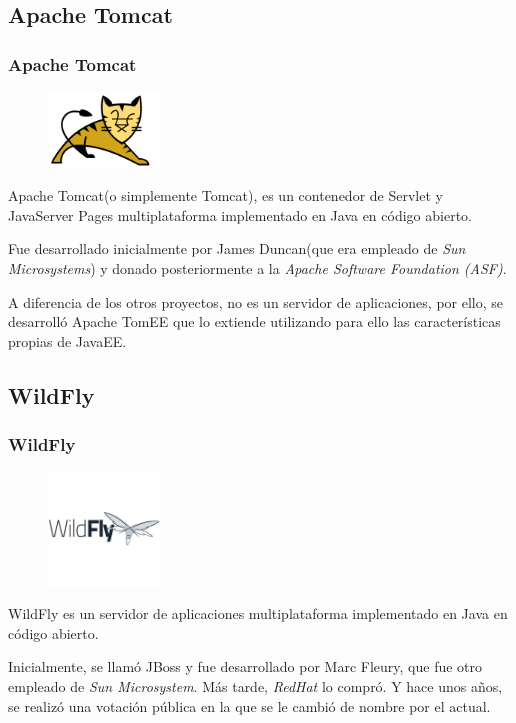 \documentclass[compress, aspectratio=169]{beamer} %
\begin{document}
	\subsection{Apache Tomcat}
		\begin{frame}
			\frametitle{Apache Tomcat}
			
			\begin{figure}
				\includegraphics[width=3cm]{Tomcat_logo.jpg}
			\end{figure} 
			
			\pause
			
			Apache Tomcat(o simplemente Tomcat), es un contenedor de Servlet y JavaServer
			Pages multiplataforma implementado en Java en código abierto.
			
			Fue desarrollado inicialmente por James Duncan(que era empleado de \textit{Sun
			Microsystems}) y donado posteriormente a la \textit{Apache Software Foundation (ASF)}.
			
			A diferencia de los otros proyectos, no es un servidor de aplicaciones, por ello,
			se desarrolló Apache TomEE que lo extiende utilizando para ello las características
			propias de JavaEE.
		\end{frame}

	\subsection{WildFly}
		\begin{frame}
			\frametitle{WildFly}
			
			\begin{figure}
				\includegraphics[width=3cm]{WildFly_logo.jpg}
			\end{figure}
			
			\pause
			
			WildFly es un servidor de aplicaciones multiplataforma implementado en Java en
			código abierto.
			
			Inicialmente, se llamó JBoss y fue desarrollado por Marc Fleury, que fue otro
			empleado de \textit{Sun Microsystem}. Más tarde, \textit{RedHat} lo compró. Y hace
			unos años, se realizó una votación pública en la que se le cambió de nombre por el
			actual.
			
		\end{frame}
	
\end{document}
